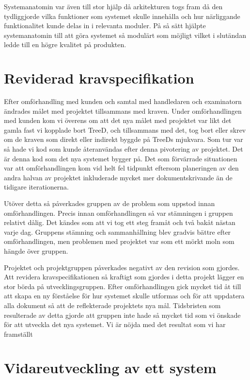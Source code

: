 Systemanatomin var även till stor hjälp då arkitekturen togs fram då den tydliggjorde vilka funktioner som systemet skulle innehålla och hur närliggande funktionalitet kunde delas in i relevanta moduler. På så sätt hjälpte systemanatomin till att göra systemet så modulärt som möjligt vilket i slutändan ledde till en högre kvalitet på produkten.

\section{Reviderad kravspecifikation}
Efter omförhandling med kunden och samtal med handledaren och examinatorn ändrades målet med projektet tillsammans med kraven. Under omförhandlingen med kunden kom vi överens om att det nya målet med projektet var likt det gamla fast vi kopplade bort TreeD, och tillsammans med det, tog bort eller skrev om de kraven som direkt eller indirekt byggde på TreeDs mjukvara. Som tur var så hade vi kod som kunde återanvändas efter denna pivotering av projektet. Det är denna kod som det nya systemet bygger på. Det som förvärrade situationen var att omförhandlingen kom vid helt fel tidpunkt eftersom planeringen av den andra halvan av projektet inkluderade mycket mer dokumentskrivande än de tidigare iterationerna.

Utöver detta så påverkades gruppen av de problem som uppstod innan omförhandlingen. Precis innan omförhandlingen så var stämningen i gruppen relativt dålig. Det kändes som att vi tog ett steg framåt och två bakåt nästan varje dag. Gruppens stämning och sammanhållning blev gradvis bättre efter omförhandlingen, men problemen med projektet var som ett mörkt moln som hängde över gruppen.

Projektet och projektgruppen påverkades negativt av den revision som gjordes. Att revidera kravspecifikationen så kraftigt som gjordes i detta projekt lägger en stor börda på utvecklingsgruppen. Efter omförhandlingen gick mycket tid åt till att skapa en ny förståelse för hur systemet skulle utformas och för att uppdatera alla dokument så att de reflekterade projektets nya mål. Tidsbristen som resulterade av detta gjorde att gruppen inte hade så mycket tid som vi önskade för att utveckla det nya systemet. Vi är nöjda med det resultat som vi har framställt  

\section{Vidareutveckling av ett system}


